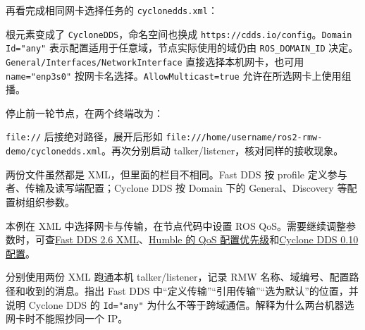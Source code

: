 \begin{example}[用两份配置选择通信网卡]
再看完成相同网卡选择任务的 \texttt{cyclonedds.xml}：
\par\medskip\noindent\begin{minipage}{\linewidth}

\end{minipage}\par\smallskip
根元素变成了 \texttt{CycloneDDS}，命名空间也换成 \nolinkurl{https://cdds.io/config}。\texttt{Domain Id="any"} 表示配置适用于任意域，节点实际使用的域仍由 \texttt{ROS\_DOMAIN\_ID} 决定。\nolinkurl{General/Interfaces/NetworkInterface} 直接选择本机网卡，也可用 \texttt{name="enp3s0"} 按网卡名选择。\texttt{AllowMulticast=true} 允许在所选网卡上使用组播。

停止前一轮节点，在两个终端改为：
\par\medskip\noindent\begin{minipage}{\linewidth}
\end{minipage}\par\smallskip
\texttt{file://} 后接绝对路径，展开后形如 \nolinkurl{file:///home/username/ros2-rmw-demo/cyclonedds.xml}。再次分别启动 talker/listener，核对同样的接收现象。
\end{example}

两份文件虽然都是 XML，但里面的栏目不相同。Fast DDS 按 profile 定义参与者、传输及读写端配置；Cyclone DDS 按 Domain 下的 General、Discovery 等配置树组织参数。

\begin{note}
本例在 XML 中选择网卡与传输，在节点代码中设置 ROS QoS。需要继续调整参数时，可查\href{https://fast-dds.docs.eprosima.com/en/2.6.x/fastdds/xml_configuration/xml_configuration.html}{Fast DDS 2.6 XML}、\href{https://github.com/ros2/rmw_fastrtps/tree/humble#full-qos-configuration}{Humble 的 QoS 配置优先级}和\href{https://cyclonedds.io/docs/cyclonedds/0.10.2/config.html}{Cyclone DDS 0.10 配置}。
\end{note}

\begin{exercise}
\label{ex:v2-ros-rmw}
分别使用两份 XML 跑通本机 talker/listener，记录 RMW 名称、域编号、配置路径和收到的消息。指出 Fast DDS 中“定义传输”“引用传输”“选为默认”的位置，并说明 Cyclone DDS 的 \texttt{Id="any"} 为什么不等于跨域通信。解释为什么两台机器选网卡时不能照抄同一个 IP。
\end{exercise}

